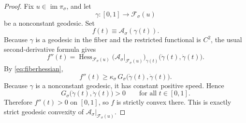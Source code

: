 \documentclass[11pt]{article}
\newcommand{\SubMetric}[1]{G_{#1}}
\newcommand{\DataProj}[1]{\pi_{#1}}
\newcommand{\Fiber}[1]{\mathcal F_{#1}}
\newcommand{\StationaryFunctional}[1]{\mathscr A_{#1}}
\begin{document}
\begin{proof}
Fix \(u\in\operatorname{im}\DataProj{\sigma}\), and let
\[
\gamma:[0,1]\to\Fiber{\sigma}(u)
\]
be a nonconstant geodesic. Set
\[
f(t)\equiv \StationaryFunctional{\sigma}(\gamma(t)).
\]
Because \(\gamma\) is a geodesic in the fiber and the restricted functional is \(C^{2}\), the usual second-derivative formula gives
\[
f''(t)
=
\operatorname{Hess}_{\Fiber{\sigma}(u)}
\bigl(\StationaryFunctional{\sigma}\big|_{\Fiber{\sigma}(u)}\bigr)_{\gamma(t)}
\bigl(\dot\gamma(t),\dot\gamma(t)\bigr).
\]
By \eqref{eq:fiberhessian},
\[
f''(t)\ge \kappa_{\sigma}\,
\SubMetric{\sigma}\bigl(\dot\gamma(t),\dot\gamma(t)\bigr).
\]
Because \(\gamma\) is a nonconstant geodesic, it has constant positive speed. Hence
\[
\SubMetric{\sigma}\bigl(\dot\gamma(t),\dot\gamma(t)\bigr)>0
\qquad
\text{for all }t\in[0,1].
\]
Therefore \(f''(t)>0\) on \([0,1]\), so \(f\) is strictly convex there. This is exactly strict geodesic convexity of \(\StationaryFunctional{\sigma}\big|_{\Fiber{\sigma}(u)}\).
\end{proof}
\end{document}
